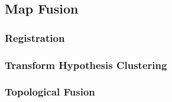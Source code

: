\subsection{Map Fusion}

\subsubsection{Registration}
\subsubsection{Transform Hypothesis Clustering}
\subsubsection{Topological Fusion}